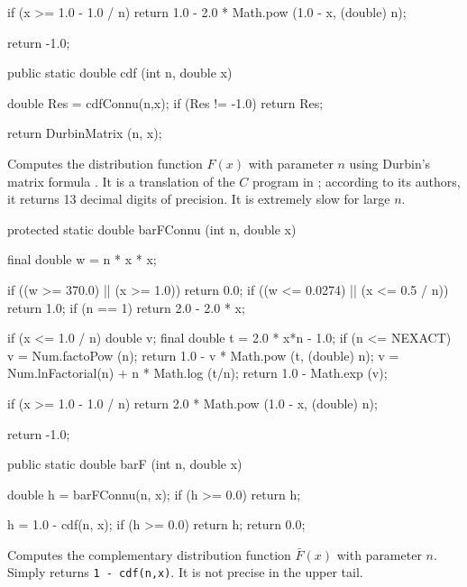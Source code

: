 \begin{code}
\begin{hide}
{      if (x >= 1.0 - 1.0 / n) {
         return 1.0 - 2.0 * Math.pow (1.0 - x, (double) n);
      }

      return -1.0;
   }\end{hide}

   public static double cdf (int n, double x)\begin{hide} {
      double Res = cdfConnu(n,x);
      if (Res != -1.0)
         return Res;

      return DurbinMatrix (n, x);
   }\end{hide}
\end{code}
\begin{tabb}
Computes the \ks{} distribution function $F(x)$ with parameter $n$
using Durbin's matrix formula \cite{tDUR73a}. It is a translation of the
$C$ program in \cite{tMAR03a};
according to its authors, it returns 13 decimal digits
of precision. It is extremely slow for large $n$.
 \end{tabb}
\begin{code}\begin{hide}

   protected static double barFConnu (int n, double x) {
      final double w = n * x * x;

      if ((w >= 370.0) || (x >= 1.0))
         return 0.0;
      if ((w <= 0.0274) || (x <= 0.5 / n))
         return 1.0;
      if (n == 1)
         return 2.0 - 2.0 * x;

      if (x <= 1.0 / n) {
         double v;
         final double t = 2.0 * x*n - 1.0;
         if (n <= NEXACT) {
            v = Num.factoPow (n);
            return 1.0 - v * Math.pow (t, (double) n);
         }
         v = Num.lnFactorial(n) + n * Math.log (t/n);
         return 1.0 - Math.exp (v);
      }

      if (x >= 1.0 - 1.0 / n) {
         return 2.0 * Math.pow (1.0 - x, (double) n);
      }

      return -1.0;
   }\end{hide}

   public static double barF (int n, double x)\begin{hide} {
      double h = barFConnu(n, x);
      if (h >= 0.0)
         return h;

      h = 1.0 - cdf(n, x);
      if (h >= 0.0)
         return h;
      return 0.0;
   }\end{hide}
\end{code}
\begin{tabb}
  Computes the complementary  distribution function  $\bar F(x)$
  with parameter $n$. Simply returns \texttt{1 - cdf(n,x)}. It is not precise in
  the upper tail.
\end{tabb}
